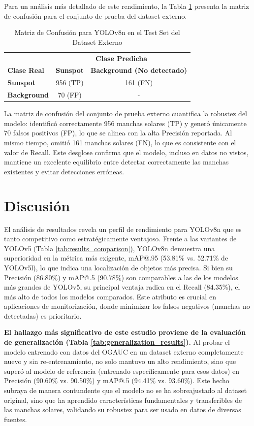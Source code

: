 \documentclass[journal]{IEEEtran}
\begin{document}
Para un análisis más detallado de este rendimiento, la Tabla \ref{tab:confusion_matrix_external} presenta la matriz de confusión para el conjunto de prueba del dataset externo.

\begin{table}[htbp]
\centering
\caption{Matriz de Confusión para YOLOv8n en el Test Set del Dataset Externo}
\label{tab:confusion_matrix_external}
\begin{tabular}{@{}l|cc@{}}
\toprule
\textbf{} & \multicolumn{2}{c}{\textbf{Clase Predicha}} \\
\textbf{Clase Real} & \textbf{Sunspot} & \textbf{Background (No detectado)} \\
\midrule
\textbf{Sunspot} & 956 (TP) & 161 (FN) \\
\textbf{Background} & 70 (FP) & - \\
\bottomrule
\end{tabular}
\end{table}

La matriz de confusión del conjunto de prueba externo cuantifica la robustez del modelo: identificó correctamente 956 manchas solares (TP) y generó únicamente 70 falsos positivos (FP), lo que se alinea con la alta Precisión reportada. Al mismo tiempo, omitió 161 manchas solares (FN), lo que es consistente con el valor de Recall. Este desglose confirma que el modelo, incluso en datos no vistos, mantiene un excelente equilibrio entre detectar correctamente las manchas existentes y evitar detecciones erróneas.

\section{Discusión}

El análisis de resultados revela un perfil de rendimiento para YOLOv8n que es tanto competitivo como estratégicamente ventajoso. Frente a las variantes de YOLOv5 (Tabla \ref{tab:results_comparison}), YOLOv8n demuestra una superioridad en la métrica más exigente, mAP@.95 (53.81\% vs. 52.71\% de YOLOv5l), lo que indica una localización de objetos más precisa. Si bien su Precisión (86.80\%) y mAP@.5 (90.78\%) son comparables a las de los modelos más grandes de YOLOv5, su principal ventaja radica en el Recall (84.35\%), el más alto de todos los modelos comparados. Este atributo es crucial en aplicaciones de monitorización, donde minimizar los falsos negativos (manchas no detectadas) es prioritario.

\textbf{El hallazgo más significativo de este estudio proviene de la evaluación de generalización (Tabla \ref{tab:generalization_results}).} Al probar el modelo entrenado con datos del OGAUC en un dataset externo completamente nuevo y sin re-entrenamiento, no solo mantuvo un alto rendimiento, sino que superó al modelo de referencia (entrenado específicamente para esos datos) en Precisión (90.60\% vs. 90.50\%) y mAP@.5 (94.41\% vs. 93.60\%). Este hecho subraya de manera contundente que el modelo no se ha sobreajustado al dataset original, sino que ha aprendido características fundamentales y transferibles de las manchas solares, validando su robustez para ser usado en datos de diversas fuentes.
\end{document}
